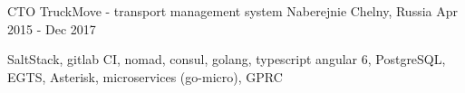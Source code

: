 \begin{cventries}
  \cventry
    {CTO} %
    {TruckMove - transport management system} %
    {Naberejnie Chelny, Russia} %
    {Apr 2015 - Dec 2017} %
    {
      \begin{cvitems} %
        \item {SaltStack, gitlab CI, nomad, consul, golang, typescript angular 6, PostgreSQL, EGTS, Asterisk, microservices (go-micro), GPRC}
      \end{cvitems}
    }


\end{cventries}

